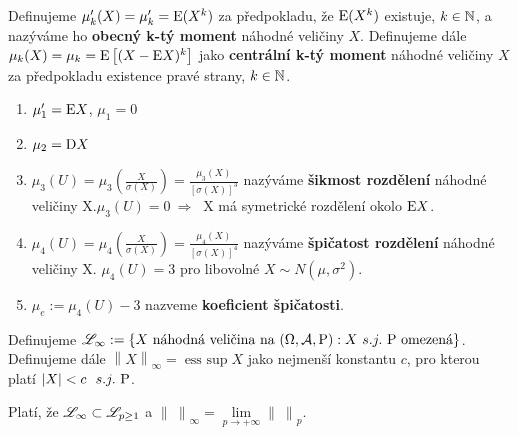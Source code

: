\begin{define}
	Definujeme $\mu'_k(X)=\mu'_k=\mathrm{E} (X^k)$ za předpokladu, že $\mathrm{E} (X^k)$ existuje, $k\in\mathbb{N}$, a nazýváme ho \textbf{obecný k-tý moment} náhodné veličiny $X$. Definujeme dále \newline
	$ \mu_k(X)=\mu_k=\mathrm{E} \left[ (X-\mathrm{E} X)^k \right] $ jako \textbf{centrální k-tý moment} náhodné veličiny $X$ za předpokladu existence pravé strany, $k\in\mathbb{N}$.
	\begin{enumerate}
		\item $\mu'_1=\mathrm{E} X$, $\mu_1=0$
		\item $\mu_2=\mathrm{D} X$
		\item $\mu_3(U)=\mu_3\left( \frac{X}{\sigma(X)} \right)=\frac{\mu_3(X)}{[\sigma(X)]^3}$ nazýváme \textbf{šikmost rozdělení} náhodné veličiny X.\newline $\mu_3(U)=0~\Rightarrow~$ X má symetrické rozdělení okolo $\mathrm{E} X$.
		\item $\mu_4(U)=\mu_4\left( \frac{X}{\sigma(X)} \right)=\frac{\mu_4(X)}{[\sigma(X)]^4}$ nazýváme \textbf{špičatost rozdělení} náhodné veličiny X.\newline
		$\mu_4(U)=3$ pro libovolné $X\sim N(\mu,\sigma^2)$.
		\item $\mu_e:=\mu_4(U)-3$ nazveme \textbf{koeficient špičatosti}.
	\end{enumerate}
\end{define}
\begin{define}
	Definujeme $\mathscr{L}_{\infty}:=\{ X\text{ náhodná veličina na }(\Omega,\mathcal{A},\mathrm{P}): X~s.j.~\mathrm{P}\text{ omezená} \}$. Definujeme dále $\left\|X\right\|_{\infty}=\mathop{\mathrm{ess~sup}} X$ jako nejmenší konstantu $c$, pro kterou platí $|X|<c~~s.j.~\mathrm{P}$.
\end{define}

\begin{theorem}
	Platí, že $\mathscr{L}_{\infty}\subset \mathscr{L}_{p\geq 1}$ a $\left\|~\right\|_{\infty}=\lim\limits_{ p\to +\infty}\left\|~\right\|_p$.
\end{theorem}
